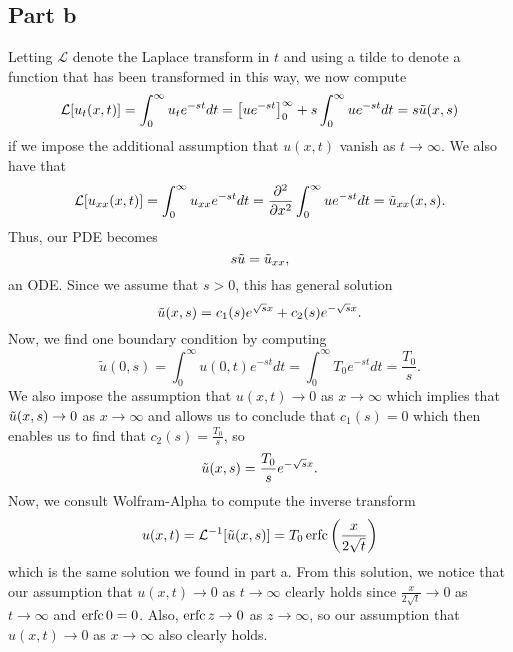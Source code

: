 \documentclass{article}
\begin{document}
\subsection{Part b}
Letting $\mathcal{L}$ denote the Laplace transform in $t$ and using a tilde to denote a function that has been transformed in this way, we now compute 
\[
\mathcal{L}[u_t(x,t)]=\int_0^\infty u_te^{-st}dt=\left[ue^{-st}\right]_0^\infty+s\int_0^\infty ue^{-st}dt=s\Tilde{u}(x,s)
\]
if we impose the additional assumption that $u(x,t)$ vanish as $t\to\infty$. We also have that
\[
\mathcal{L}[u_{xx}(x,t)]=\int_0^\infty u_{xx}e^{-st}dt=\frac{\partial^2}{\partial x^2}\int_0^\infty ue^{-st}dt=\Tilde{u}_{xx}(x,s).
\]
Thus, our PDE becomes
\[
s\Tilde{u}=\Tilde{u}_{xx},
\]
an ODE. Since we assume that $s>0$, this has general solution 
\[
\Tilde{u}(x,s)=c_1(s)e^{\sqrt{s}x}+c_2(s)e^{-\sqrt{s}x}.
\]
Now, we find one boundary condition by computing
\[
\tilde{u}(0,s)=\int_0^\infty u(0,t)e^{-st}dt=\int_0^\infty T_0e^{-st}dt=\frac{T_0}{s}.
\]
We also impose the assumption that $u(x,t)\to0$ as $x\to\infty$ which implies that $\Tilde{u}(x,s)\to0$ as $x\to\infty$ and allows us to conclude that $c_1(s)=0$ which then enables us to find that $c_2(s)=\frac{T_0}{s}$, so
\[
\Tilde{u}(x,s)=\frac{T_0}{s}e^{-\sqrt{s}x}.
\]
Now, we consult Wolfram-Alpha to compute the inverse transform
\[
u(x,t)=\mathcal{L}^{-1}[\Tilde{u}(x,s)]=T_0\operatorname{erfc}\left(\frac{x}{2\sqrt{t}}\right)
\]
which is the same solution we found in part a. From this solution, we notice that our assumption that $u(x,t)\to0$ as $t\to\infty$
clearly holds since $\frac{x}{2\sqrt{t}}\to0$ as $t\to\infty$ and $\operatorname{erfc}0=0$. Also, $\operatorname{erfc} z\to0$ as $z\to\infty$, so our assumption that $u(x,t)\to0$ as $x\to\infty$ also clearly holds. 
\end{document}
